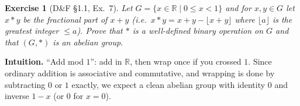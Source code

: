 \documentclass[12pt]{article}
\newtheorem{exercise}[theorem]{Exercise}
\theoremstyle{definition}
\begin{document}
\newpage

\begin{exercise}[D\&F §1.1, Ex.~7]
Let $G=\{x\in\mathbb{R}\mid 0\le x<1\}$ and for $x,y\in G$ let $x*y$ be the fractional part of $x+y$
(i.e.\ $x*y=x+y-\lfloor x+y\rfloor$ where $\lfloor a\rfloor$ is the greatest integer $\le a$).
Prove that $*$ is a well-defined binary operation on $G$ and that $(G,*)$ is an abelian group.
\end{exercise}

\dotfill

\noindent
\textbf{Intuition.}
“Add mod $1$”: add in $\mathbb{R}$, then wrap once if you crossed $1$. Since ordinary addition is associative and commutative,
and wrapping is done by subtracting $0$ or $1$ exactly, we expect a clean abelian group with identity $0$ and inverse $1-x$ (or $0$ for $x=0$).

\dotfill
\end{document}
